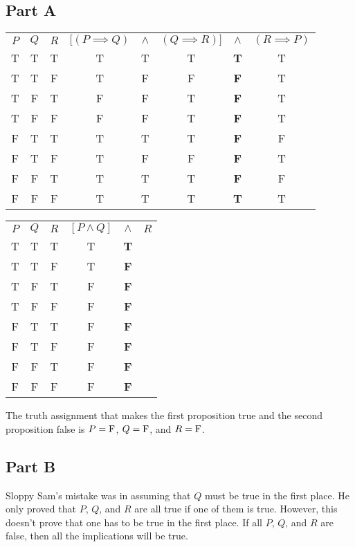 \documentclass{article}
\begin{document}
\subsection*{Part A}

\begin{center}
  \begin{tabular}{ c c c c c c c c }
    $P$ & $Q$ & $R$ & $[(P \implies Q)$ & $\land$ & $(Q \implies R)]$ & $\land$ &
    $(R \implies P)$ \\
    T & T & T & T & T & T & \textbf{T} & T \\
    T & T & F & T & F & F & \textbf{F} & T \\
    T & F & T & F & F & T & \textbf{F} & T \\
    T & F & F & F & F & T & \textbf{F} & T \\
    F & T & T & T & T & T & \textbf{F} & F \\
    F & T & F & T & F & F & \textbf{F} & T \\
    F & F & T & T & T & T & \textbf{F} & F \\
    F & F & F & T & T & T & \textbf{T} & T \\
  \end{tabular}
\end{center}

\begin{center}
  \begin{tabular}{ c c c c c c }
    $P$ & $Q$ & $R$ & $[P \land Q]$ & $\land$ & $R$ \\
    T & T & T & T & \textbf{T} &  \\
    T & T & F & T & \textbf{F} &  \\
    T & F & T & F & \textbf{F} &  \\
    T & F & F & F & \textbf{F} &  \\
    F & T & T & F & \textbf{F} &  \\
    F & T & F & F & \textbf{F} &  \\
    F & F & T & F & \textbf{F} &  \\
    F & F & F & F & \textbf{F} &  \\
  \end{tabular}
\end{center}

The truth assignment that makes the first proposition true and the second
proposition false is $P = \rm{F}$, $Q = \rm{F}$, and $R = \rm{F}$.

\subsection*{Part B}

Sloppy Sam's mistake was in assuming that $Q$ must be true in the first place.
He only proved that $P$, $Q$, and $R$ are all true if one of them is true.
However, this doesn't prove that one has to be true in the first place. If all
$P$, $Q$, and $R$ are false, then all the implications will be true.
\end{document}
